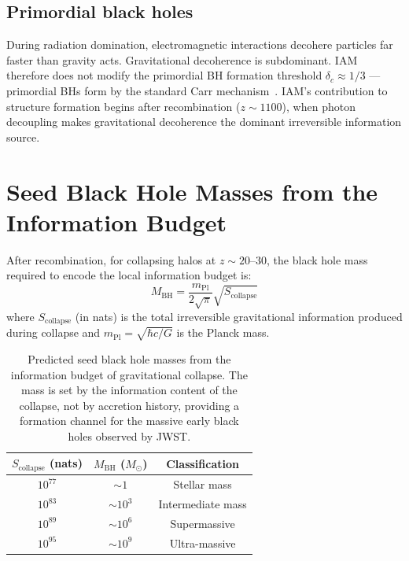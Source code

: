 \documentclass[12pt,a4paper]{article}
\begin{document}
\subsection{Primordial black holes}

During radiation domination, electromagnetic interactions decohere particles far
faster than gravity acts. Gravitational decoherence is subdominant. IAM therefore
does not modify the primordial BH formation threshold $\delta_c \approx 1/3$ ---
primordial BHs form by the standard Carr mechanism~\citep{Carr1975}. IAM's
contribution to structure formation begins after recombination ($z \sim 1100$),
when photon decoupling makes gravitational decoherence the dominant irreversible
information source.

\section{Seed Black Hole Masses from the Information Budget}

After recombination, for collapsing halos at $z \sim 20$--$30$, the black hole
mass required to encode the local information budget is:
\begin{equation}
M_\mathrm{BH} = \frac{m_\mathrm{Pl}}{2\sqrt{\pi}} \sqrt{S_\mathrm{collapse}}
\end{equation}
where $S_\mathrm{collapse}$ (in nats) is the total irreversible gravitational
information produced during collapse and
$m_\mathrm{Pl} = \sqrt{\hbar c/G}$ is the Planck mass.

\begin{table}[h]
\centering
\caption{Predicted seed black hole masses from the information budget of
gravitational collapse. The mass is set by the information content of the
collapse, not by accretion history, providing a formation channel for the
massive early black holes observed by JWST.}
\label{tab:seeds}
\begin{tabular}{ccc}
\toprule
$S_\mathrm{collapse}$ (nats) & $M_\mathrm{BH}$ ($M_\odot$) & Classification \\
\midrule
$10^{77}$ & $\sim 1$    & Stellar mass \\
$10^{83}$ & $\sim 10^3$ & Intermediate mass \\
$10^{89}$ & $\sim 10^6$ & Supermassive \\
$10^{95}$ & $\sim 10^9$ & Ultra-massive \\
\bottomrule
\end{tabular}
\end{table}
\end{document}
